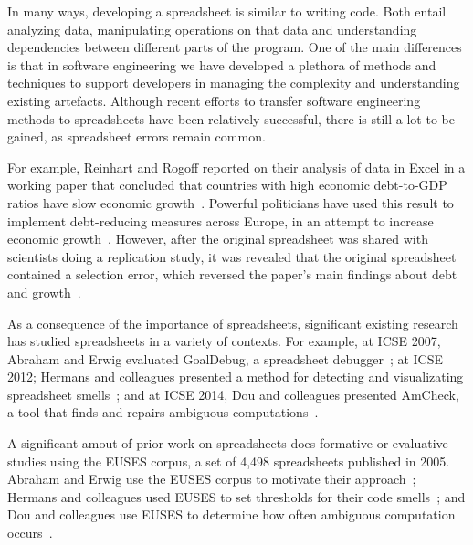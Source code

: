 \documentclass[conference]{IEEEtran}
\begin{document}
In many ways, developing a spreadsheet is similar to writing code. Both entail 
analyzing data, manipulating operations on that data and understanding dependencies 
between different parts of the program. One of the main differences is that in software 
engineering we have developed a plethora of methods and techniques to support developers
in managing the complexity and understanding existing artefacts. Although recent efforts to 
transfer software engineering methods to spreadsheets have been relatively successful\cite{thesishermans}, 
there is still a lot to be gained, as spreadsheet errors remain common.

For example, Reinhart and Rogoff reported on their analysis of data in Excel in 
a working paper that concluded that countries with high economic debt-to-GDP
ratios have slow economic growth~\cite{reinhart2010growth}.
Powerful politicians have used this result to implement debt-reducing measures
across Europe, in an attempt to increase economic growth~\cite{cassidy}.
However, after the original spreadsheet was shared with scientists doing a replication
study, it was revealed that the original spreadsheet contained a selection error,
which reversed the paper's main findings about debt and growth~\cite{coy}.

As a consequence of the importance of spreadsheets, significant existing research
has studied spreadsheets in a variety of contexts.
For example, at ICSE 2007, Abraham and Erwig evaluated GoalDebug, a spreadsheet
debugger~\cite{abraham2007goaldebug}; at ICSE 2012; Hermans and colleagues presented a method for
detecting and visualizating spreadsheet smells~\cite{hermans2012detecting}; and 
at ICSE 2014, Dou and colleagues presented AmCheck,
a tool that finds and repairs ambiguous computations~\cite{dou2014spreadsheet}.

A significant amout of prior work on spreadsheets does formative or evaluative 
studies using the EUSES corpus, a set of 4,498 spreadsheets published in 2005.
Abraham and Erwig use the EUSES corpus to motivate their approach~\cite{abraham2007goaldebug};
Hermans and colleagues used EUSES to set thresholds 
for their code smells~\cite{hermans2012detecting}; and Dou and colleagues
use EUSES to determine how often ambiguous computation occurs~\cite{dou2014spreadsheet}.

\end{document}

